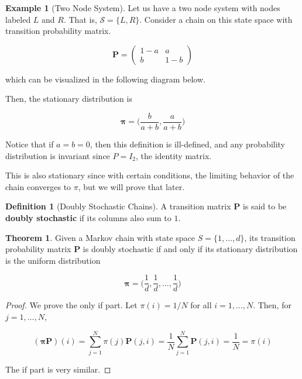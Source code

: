 \documentclass{article}
\theoremstyle{definition}
\newtheorem{theorem}{Theorem}[section]
\newtheorem{example}{Example}[section]
\theoremstyle{remark}
\theoremstyle{definition}
\newtheorem{definition}{Definition}[section]
\begin{document}
    \begin{example}[Two Node System]
      Let us have a two node system with nodes labeled $L$ and $R$. That is, $\mathcal{S} = \{L, R\}$. Consider a chain on this state space with transition probability matrix. 

        \[\mathbf{P} = \begin{pmatrix}
        1-a & a \\ b & 1-b 
        \end{pmatrix}\]

      which can be visualized in the following diagram below.

      \begin{center}
      \end{center}

      Then, the stationary distribution is 

        \[\boldsymbol{\pi} = \Big( \frac{b}{a+b}, \frac{a}{a+b} \Big)\]

      Notice that if $a = b = 0$, then this definition is ill-defined, and any probability distribution is invariant since $P = I_2$, the identity matrix. 
    \end{example}

    This is also stationary since with certain conditions, the limiting behavior of the chain converges to $\pi$, but we will prove that later. 

    \begin{definition}[Doubly Stochastic Chains]
      A transition matrix $\mathbf{P}$ is said to be \textbf{doubly stochastic} if its columns also sum to $1$. 
    \end{definition}

    \begin{theorem}
      Given a Markov chain with state space $S = \{1, \ldots, d\}$, its transition probability matrix $\mathbf{P}$ is doubly stochastic if and only if its stationary distribution is the uniform distribution 

        \[\boldsymbol{\pi} = \bigg( \frac{1}{d}, \frac{1}{d}, \ldots, \frac{1}{d} \bigg)\]
    \end{theorem}
    \begin{proof}
      We prove the only if part. Let $\pi(i) = 1/N$ for all $i = 1, \ldots, N$. Then, for $j = 1, \ldots, N$, 

        \[(\boldsymbol{\pi} \mathbf{P}) (i) = \sum_{j=1}^N \pi(j) \mathbf{P}(j, i) = \frac{1}{N} \sum_{j=1}^N \mathbf{P}(j, i) = \frac{1}{N} = \pi(i) \]

      The if part is very similar. 
    \end{proof}
\end{document}
